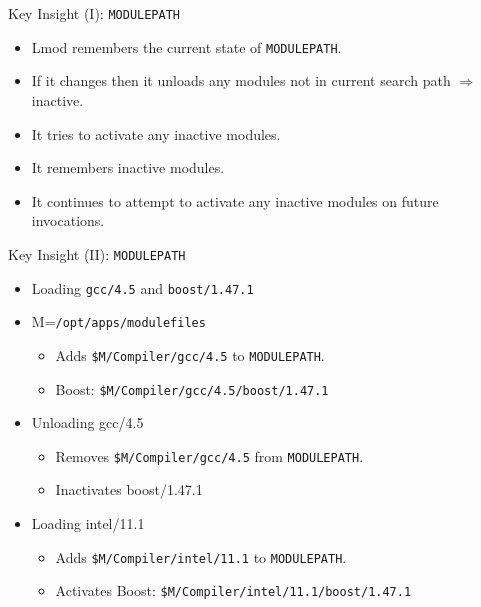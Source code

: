\documentclass{beamer}
\begin{document}
\begin{frame}{Key Insight (I): \texttt{MODULEPATH}}
  \begin{itemize}
    \item Lmod remembers the current state of \texttt{MODULEPATH}.
    \item If it changes then it unloads any modules not in current
      search path $\Rightarrow$ inactive.
    \item It tries to activate any inactive modules.
    \item It remembers inactive modules.
    \item It continues to attempt to activate any inactive modules on
      future invocations. 
  \end{itemize}
\end{frame}

\begin{frame}{Key Insight (II): \texttt{MODULEPATH}}
  \begin{itemize}
    \item Loading \texttt{gcc/4.5} and \texttt{boost/1.47.1}
    \item M=\texttt{{\color{blue}/opt/apps/modulefiles}}
      \begin{itemize}
        \item Adds \texttt{{\color{blue}\$M}/Compiler/gcc/4.5} to
          \texttt{MODULEPATH}.
        \item Boost: \texttt{{\color{blue}\$M}/Compiler/gcc/4.5/boost/1.47.1}
      \end{itemize}
    \item Unloading gcc/4.5
      \begin{itemize}
        \item Removes \texttt{{\color{blue}\$M}/Compiler/gcc/4.5}
          from \texttt{MODULEPATH}.
        \item Inactivates boost/1.47.1
      \end{itemize}
    \item Loading intel/11.1
      \begin{itemize}
        \item Adds \texttt{{\color{blue}\$M}/Compiler/intel/11.1} to
          \texttt{MODULEPATH}.
        \item Activates Boost: \texttt{{\color{blue}\$M}/Compiler/intel/11.1/boost/1.47.1}
      \end{itemize}
  \end{itemize}
\end{frame}
\end{document}
